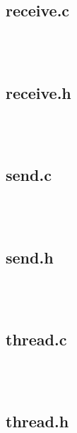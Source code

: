 \documentclass{article}
\begin{document}
\subsection*{receive.c}

\begin{verbatim}



\end{verbatim}

\subsection*{receive.h}

\begin{verbatim}



\end{verbatim}

\subsection*{send.c}

\begin{verbatim}



\end{verbatim}

\subsection*{send.h}

\begin{verbatim}



\end{verbatim}

\subsection*{thread.c}

\begin{verbatim}



\end{verbatim}

\subsection*{thread.h}

\begin{verbatim}



\end{verbatim}
\end{document}
